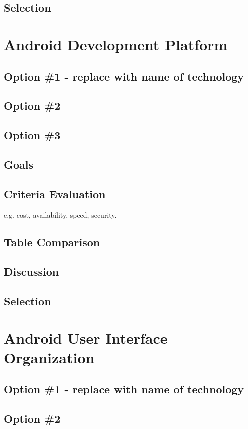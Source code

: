 \documentclass[letterpaper,10pt,draftclsnofoot,onecolumn,titlepage]{IEEEtran}
\begin{document}
	\subsection{Selection}
	
	\section{Android Development Platform}
	\subsection{Option \#1 - replace with name of technology}
	\subsection{Option \#2}
	\subsection{Option \#3}
	\subsection{Goals}
	\subsection{Criteria Evaluation}
	e.g. cost, availability, speed, security.
	\subsection{Table Comparison}
	\subsection{Discussion}
	\subsection{Selection}
	
	\section{Android User Interface Organization}
	\subsection{Option \#1 - replace with name of technology}
	\subsection{Option \#2}
\end{document}
